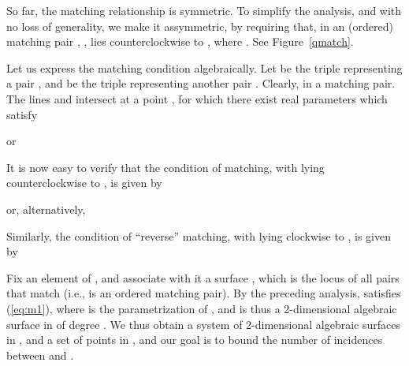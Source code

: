 \documentclass[12pt]{article}
\begin{document}
So far, the matching relationship is symmetric. To simplify the
analysis, and with no loss of generality, we make it assymmetric, by
requiring that, in an (ordered) matching pair
, ,  lies counterclockwise to
, where . See Figure~\ref{qmatch}.

Let us express the matching condition algebraically.
Let  be the triple representing a pair
, and  be the triple representing
another pair .
Clearly,  in a matching pair.
The lines  and  intersect at a point , for which
there exist real parameters  which satisfy

or

It is now easy to verify that the condition of matching, with
 lying counterclockwise to , is given by

or, alternatively,

Similarly, the condition of ``reverse'' matching, with 
lying clockwise to , is given by


Fix an element  of , and associate with it a surface
, which is the locus of all
pairs  that match  (i.e., 
is an ordered matching pair).
By the preceding analysis,  satisfies (\ref{eq:m1}),
where  is the parametrization of ,
and is thus a 2-dimensional algebraic surface
in  of degree . We thus obtain a system  of 
 2-dimensional algebraic surfaces in , and a set  
of  points in , and our goal is to bound the number 
of incidences between  and . 
\end{document}
